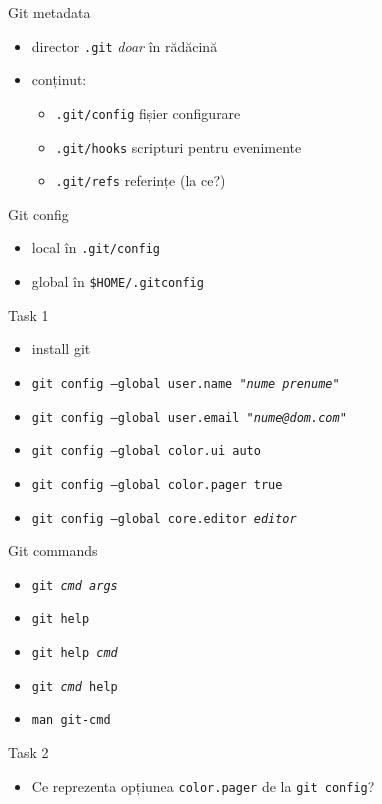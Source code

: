 \documentclass{beamer}
\begin{document}
\begin{frame}{Git metadata}
  \begin{itemize}[<+->]
    \item director \texttt{.git} \textit{doar} în rădăcină
    \item conținut:
      \begin{itemize}
        \item \texttt{.git/config} fișier configurare
        \item \texttt{.git/hooks} scripturi pentru evenimente
        \item \texttt{.git/refs} referințe (la ce?)
      \end{itemize}
  \end{itemize}
\end{frame}

\begin{frame}{Git config}
  \begin{itemize}
    \item local în \texttt{.git/config}
    \item global în \texttt{\$HOME/.gitconfig}
  \end{itemize}
  \pause
  \begin{alertblock}{Task 1}
    \begin{itemize}
      \item install git
      \item \texttt{git config --global user.name "\textit{nume prenume}"}
      \item \texttt{git config --global user.email "\textit{nume@dom.com}"}
      \item \texttt{git config --global color.ui auto}
      \item \texttt{git config --global color.pager true}
      \item \texttt{git config --global core.editor \textit{editor}}
    \end{itemize}
  \end{alertblock}
\end{frame}

\begin{frame}{Git commands}
  \begin{itemize}
    \item \texttt{git \textit{cmd args}}
    \item \texttt{git help}
    \item \texttt{git help \textit{cmd}}
    \item \texttt{git \textit{cmd} help}
    \item \texttt{man git-\texttt{cmd}}
  \end{itemize}
  \pause
  \begin{alertblock}{Task 2}
    \begin{itemize}
      \item Ce reprezenta opțiunea \texttt{color.pager} de la \texttt{git config}?
    \end{itemize}
  \end{alertblock}
\end{frame}
\end{document}
